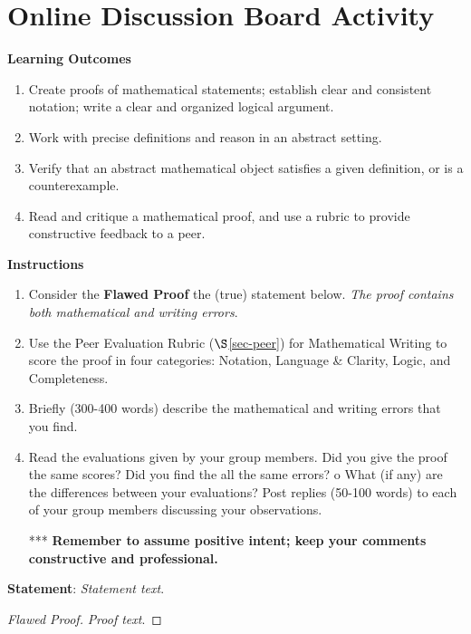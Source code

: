 \section{Online Discussion Board Activity}
\textbf{Learning Outcomes}
\begin{enumerate}
	\item Create proofs of mathematical statements; establish clear and consistent notation; write a clear and organized logical argument. 
	\item Work with precise definitions and reason in an abstract setting.
	\item Verify that an abstract mathematical object satisfies a given definition, or is a counterexample. 
	\item Read and critique a mathematical proof, and use a rubric to provide constructive feedback to a peer.
\end{enumerate}

\noindent\textbf{Instructions}
\begin{enumerate}
	\item Consider the \textbf{Flawed Proof} the (true) statement below.  \emph{The proof contains both mathematical and writing errors}.
	\item Use the Peer Evaluation Rubric ($\S$\ref{sec-peer}) for Mathematical Writing to score the proof in four categories: Notation, Language \& Clarity, Logic, and Completeness.  
	\item Briefly (300-400 words) describe the mathematical and writing errors that you find.
	\item Read the evaluations given by your group members.  Did you give the proof the same scores? Did you find the all the same errors? o	What (if any) are the differences between your evaluations? Post replies (50-100 words) to each of your group members discussing your observations.
	\item[***] \textbf{Remember to assume positive intent; keep your comments constructive and professional.}  
\end{enumerate}

\vfill

\noindent\textbf{Statement}: \emph{Statement text}.

\begin{proof}[Flawed Proof]
\emph{Proof text}.
\end{proof}

